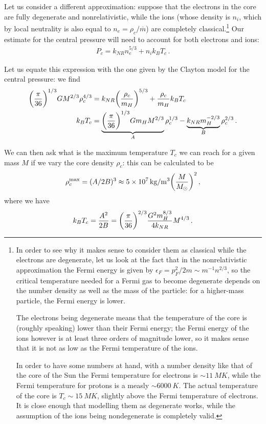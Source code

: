 \documentclass[main.tex]{subfiles}
\begin{document}
Let us consider a different approximation: suppose that the electrons in the core are fully degenerate and nonrelativistic, while the ions (whose density is \(n_i\), which by local neutrality is also equal to \(n_e = \rho _c / \overline{m}\)) are completely classical.\footnote{In order to see why it makes sense to consider them as classical while the electrons are degenerate, let us look at the fact that in the nonrelativistic approximation the Fermi energy is given by \(\epsilon _F = p_F^2 / 2m \sim m^{-1} n^{2/3}\), so the critical temperature needed for a Fermi gas to become degenerate depends on the number density as well as the mass of the particle: for a higher-mass particle, the Fermi energy is lower.

The electrons being degenerate means that the temperature of the core is (roughly speaking) lower than their Fermi energy; the Fermi energy of the ions however is at least three orders of magnitude lower, so it makes sense that it is not as low as the Fermi temperature of the ions.

In order to have some numbers at hand, with a number density like that of the core of the Sun the Fermi temperature for electrons is \(\sim \SI{11}{MK}\), while the Fermi temperature for protons is a measly \(\sim \SI{6000}{K}\). The actual temperature of the core is \(T_c \sim \SI{15}{MK}\), slightly above the Fermi temperature of electrons. It is close enough that modelling them as degenerate works, while the assumption of the ions being nondegenerate is completely valid.}
Our estimate for the central pressure will need to account for both electrons and ions:
%
\begin{align}
  P_c = k_{NR} n_{e}^{5/3} + n_i k_B T_c
\,.
\end{align}
%

Let us equate this expression with the one given by the Clayton model for the central pressure: we find
%
\begin{align}
  \qty(\frac{\pi}{36})^{1/3} G M^{2/3} \rho_{c}^{4/3}
  &= k_{NR} \qty(\frac{\rho_c}{m_{H}})^{5/3} + \frac{\rho_{c}}{m_H} k_B T_c \\
  k_B T_c &= \underbrace{\qty(\frac{\pi}{36})^{1/3} G m_{H} M^{2/3}}_{A} \rho_{c}^{1/3} - \underbrace{k_{NR} m_H^{-2/3}}_{B} \rho _c^{2/3}
\,.
\end{align}
%

We can then ask what is the maximum temperature \(T_c\) we can reach for a given mass \(M\) if we vary the core density \(\rho _c\):
this can be calculated to be 
%
\begin{align}
\rho_{c}^{\text{max}} = (A/ 2B)^{3} \approx \SI{5e7}{kg/m^3} \qty( \frac{M}{M_{\odot}})^2
\,,
\end{align}
%
where we have 
%
\begin{align}
  k_B T_c = \frac{A^2}{2B} = \qty(\frac{\pi }{36})^{2/3} \frac{G^2m_H^{8/3}}{4 k_{NR}} M^{4/3}
\,.
\end{align}
\end{document}
